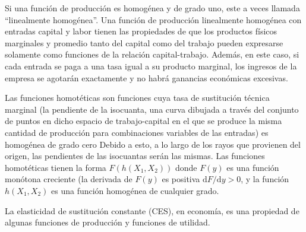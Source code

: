 Si una función de producción es homogénea y de grado uno, este a veces llamada ``linealmente homogénea''. Una función de producción linealmente homogénea con entradas capital y labor tienen las propiedades de que los productos físicos marginales y promedio tanto del capital como del trabajo pueden expresarse solamente como funciones de la relación capital-trabajo. Además, en este caso, si cada entrada se paga a una tasa igual a su producto marginal, los ingresos de la empresa se agotarán exactamente y no habrá ganancias económicas excesivas.

Las funciones homotéticas son funciones cuya tasa de sustitución técnica marginal (la pendiente de la isocuanta, una curva dibujada a través del conjunto de puntos en dicho espacio de trabajo-capital en el que se produce la misma cantidad de producción para combinaciones variables de las entradas) es homogénea de grado cero Debido a esto, a lo largo de los rayos que provienen del origen, las pendientes de las isocuantas serán las mismas. Las funciones homotéticas tienen la forma $F\left(h\left(X_{1},X_{2}\right)\right)$ donde $F(y)$ es una función monótona creciente (la derivada de $F\left(y\right)$ es positiva $\mathrm{d}F/\mathrm{d}y>0$, y la función $h\left(X_{1},X_{2}\right)$ es una función homogénea de cualquier grado.

La elasticidad de sustitución constante (CES), en economía, es una propiedad de algunas funciones de producción y funciones de utilidad.

